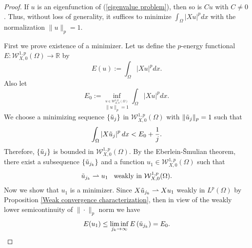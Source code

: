 \documentclass[a4paper,12pt,reqno]{amsart}
\renewcommand\eqref[1]{(\ref{#1})} %
\numberwithin{equation}{section}
\theoremstyle{plain}
\theoremstyle{definition}
\begin{document}
\begin{proof}
If $u$ is an eigenfunction of \eqref{eigenvalue problem}, then so is $Cu$ with $C\neq 0$.
Thus, without loss of generality, it suffices to minimize $\int_{\Omega}|X u|^p d x$ with  the normalization $\|u\|_{p}=1$.

First we prove existence of a minimizer. Let us define the $p$-energy functional $E:\mathcal{W}_{X,0}^{1, p}(\Omega)\to \mathbb{R}$ by
\begin{equation}\label{p-energy functional}
E(u):=\int_{\Omega}|X u|^{p} d x.
\end{equation}
Also let
\begin{equation*}
E_{0}:=\inf_{\stackrel{u \in \mathcal{W}_{X,0}^{1, p}(\Omega)}{\|u\|_{p}=1}} \int_{\Omega}|X u|^{p} d x.
\end{equation*}
We choose a minimizing sequence  $\left\{\Tilde{u}_{j}\right\}$ in $ \mathcal{W}_{X,0}^{1, p}(\Omega)$ with $\|\Tilde{u}_{j}\|_{p}=1$ such that
\begin{equation*}
\int_{\Omega}\left|X\Tilde{u}_{j}\right|^{p} d x<E_{0}+\frac{1}{j}.
\end{equation*}
Therefore, $\left\{\Tilde{u}_{j}\right\}$ is bounded in
$\mathcal{W}_{X,0}^{1, p}(\Omega)$.  By the Eberlein-\v{S}mulian theorem,  there exist  a subsequence $\{\Tilde{u}_{j_{k}}\}$ and a function $u_{1} \in \mathcal{W}_{X,0}^{1, p}(\Omega)$ such that
\begin{equation*}
\Tilde{u}_{j_{k}} \rightharpoonup  u_{1}\enspace \text{ weakly in } \mathcal{W}_{X,0}^{1, p}(\Omega). 
\end{equation*}
 Now we show that $u_{1}$ is a minimizer. Since $X\Tilde{u}_{j_{k}} \rightharpoonup  Xu_{1}$ weakly in $L^{p}(\Omega)$ by Proposition \ref{Weak convergence characterization}, then in view of the weakly lower semicontinuity of $\|\cdot\|_{p}$ norm we have
\begin{equation*}
E(u_{1}) \leq \liminf _{j_{k} \rightarrow \infty} E\left(\Tilde{u}_{j_{k}}\right)=E_{0}. 
\end{equation*}


\end{proof}
\end{document}
